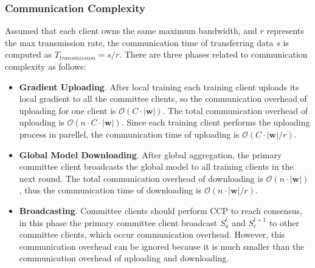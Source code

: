 \documentclass[10pt,journal,compsoc]{IEEEtran}
\newcommand{\w}{\mathbf{w}}
\begin{document}
\subsubsection{Communication Complexity}
Assumed that each client owns the same maximum bandwidth, and $r$ represents the max transmission rate, the communication time of transferring data $s$ is computed as $T_{transmission} = s/r$. There are three phases related to communication complexity as follows:
\begin{itemize}
  \item \textbf{Gradient Uploading}. After local training each training client uploads its local gradient to all the committee clients, so the communication overhead of uploading for one client is {$\mathcal{O}(C \cdot |\w|)$}. The total communication overhead of uploading is {$\mathcal{O}(n \cdot C \cdot |\w|)$}. Since each training client performs the uploading process in parellel, the communication time of uploading is {$\mathcal{O}(C \cdot |\w|/r)$}. 
  \item \textbf{Global Model Downloading}. After global aggregation, the primary committee client broadcasts the global model to all training clients in the next round. The total communication overhead of downloading is {$\mathcal{O}(n \cdot |\w|)$}, thus the communication time of downloading is {$\mathcal{O}(n \cdot |\w|/r)$}. 
  \item \textbf{Broadcasting}. Committee clients should perform CCP to reach consensus, in this phase the primary committee client broadcast $S_a^t$ and $S_c^{t+1}$ to other committee clients, which occur communication overhead. However, this communication overhead can be ignored because it is much smaller than the communication overhead of uploading and downloading. 
\end{itemize}

\end{document}
